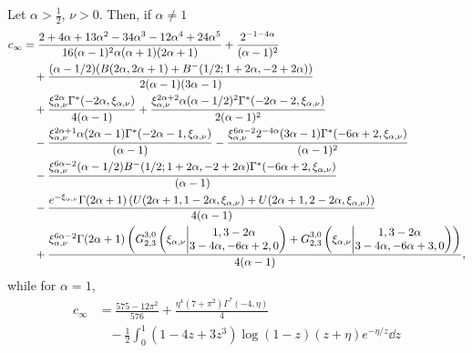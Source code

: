 \begin{theorem}\label{thm:exact_expression_c_infty}
Let $\alpha > \frac{1}{2}$, $\nu > 0$. Then, if $\alpha \ne 1$
\begin{align*}
	c_\infty 
	&=\frac{2 + 4 \alpha + 13 \alpha^2 - 34 \alpha^3 - 12\alpha^4 + 24 \alpha^5}
		{16(\alpha-1)^2 \alpha (\alpha+1) (2\alpha+1)} 
		+  \frac{2^{-1 - 4 \alpha}}{(\alpha - 1)^2} \\
	&\hspace{10pt}+ \frac{(\alpha - 1/2) (B(2 \alpha, 2 \alpha + 1) + B^-(1/2; 1 + 2 \alpha, -2 + 2 \alpha))}
		{2 (\alpha - 1) (3 \alpha - 1)} \\
	&\hspace{10pt}+ \frac{\xi_{\alpha,\nu}^{2\alpha} \Gamma^\ast( - 2 \alpha, \xi_{\alpha,\nu})}{4(\alpha-1)}
		+ \frac{\xi_{\alpha,\nu}^{2\alpha + 2}\alpha (\alpha - 1/2)^2 \Gamma^\ast(- 2 \alpha - 2, \xi_{\alpha,\nu})}
		{2(\alpha-1)^2} \\
	&\hspace{10pt}- \frac{\xi_{\alpha,\nu}^{2\alpha + 1}\alpha (2\alpha - 1) \Gamma^\ast( - 2 \alpha - 1,\xi_{\alpha,\nu})}{(\alpha-1)}
		- \frac{\xi_{\alpha,\nu}^{6\alpha-2}2^{-4\alpha}(3\alpha - 1)\Gamma^\ast( - 6 \alpha + 2, \xi_{\alpha,\nu})}{(\alpha-1)^2}\\
	&\hspace{10pt}-\frac{\xi_{\alpha,\nu}^{6\alpha - 2}(\alpha - 1/2) B^-(1/2; 1 + 2 \alpha, -2 + 2 \alpha)\Gamma^\ast( - 6 \alpha + 2, \xi_{\alpha,\nu})}{(\alpha-1)} \\
	&\hspace{10pt}- \frac{e^{-\xi_{\alpha,\nu}} \Gamma(2\alpha+1) 
		\left(U(2\alpha+1,1-2\alpha,\xi_{\alpha,\nu}) + U(2\alpha+1,2-2\alpha,\xi_{\alpha,\nu})\right)}{4(\alpha-1)} \\
	&\hspace{10pt}+ \frac{\xi_{\alpha,\nu}^{6\alpha - 2} \Gamma(2\alpha+1)\left( 	
		\MeijerGnew{3}{0}{2}{3}{1,3-2\alpha}{3-4\alpha,-6\alpha+2,0}{\xi_{\alpha,\nu}}
		+ \MeijerGnew{3}{0}{2}{3}{1,3-2\alpha}{3-4\alpha,-6\alpha+3,0}{\xi_{\alpha,\nu}}\right)}{4(\alpha-1)},
\end{align*}
while for $\alpha = 1$,
\begin{align*}
	c_\infty &= \frac{575 - 12 \pi^2}{576} + \frac{\eta^4(7 + \pi^2)\Gamma^\ast(-4, \eta)}{4}\\
	&\hspace{10pt}- \frac{1}{2} \int_0^1 (1 - 4z + 3z^3)\log(1-z)(z + \eta)e^{-\eta/z} \dd z\\

\end{align*}
\end{theorem}
